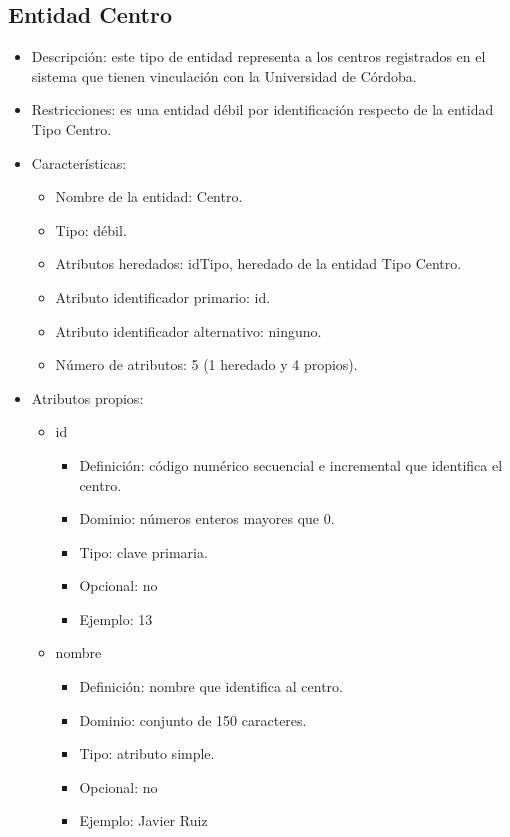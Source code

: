 \subsection{Entidad Centro}
\begin{itemize}
    \item Descripción: este tipo de entidad representa a los centros registrados en el sistema que tienen vinculación con la Universidad de Córdoba.
    \item Restricciones: es una entidad débil por identificación respecto de la entidad Tipo Centro.
    \item Características:
    \begin{itemize}
        \item Nombre de la entidad: Centro.
        \item Tipo: débil.
        \item Atributos heredados: idTipo, heredado de la entidad Tipo Centro.
        \item Atributo identificador primario: id.
        \item Atributo identificador alternativo: ninguno.
        \item Número de atributos: 5 (1 heredado y 4 propios).
    \end{itemize}

    \item Atributos propios:
    \begin{itemize}
        \item id
        \begin{itemize}
            \item Definición: código numérico secuencial e incremental que identifica el centro.
            \item Dominio: números enteros mayores que 0.
            \item Tipo: clave primaria.
            \item Opcional: no
            \item Ejemplo: 13
        \end{itemize}

        \item nombre
        \begin{itemize}
            \item Definición: nombre que identifica al centro.
            \item Dominio: conjunto de 150 caracteres.
            \item Tipo: atributo simple.
            \item Opcional: no
            \item Ejemplo: Javier Ruiz
        \end{itemize}


\end{itemize}
\end{itemize}
